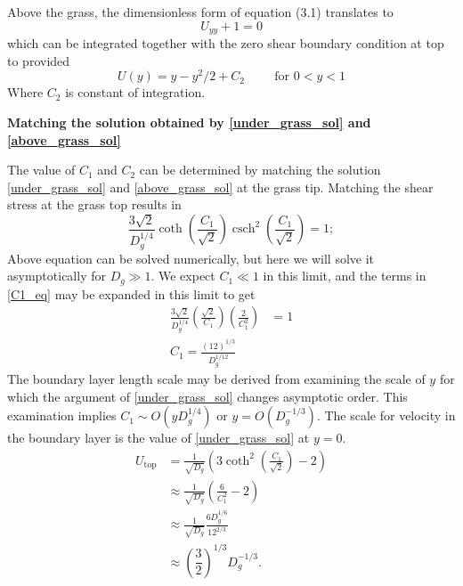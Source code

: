\documentclass[letterpaper,10pt]{article}
\DeclareMathOperator{\csch}{csch}
\begin{document}
\noindent
Above the grass, the dimensionless form of equation (3.1) translates to
\begin{equation}
 U_{yy}+1=0
\end{equation}
which can be integrated together with the zero shear boundary condition at top to provided
\begin{equation}
 U(y) = y-y^2/2+C_2 \hspace{1cm} \text{for $0<y<1$}
 \label{above_grass_sol}
\end{equation}
Where $C_2$ is constant of integration.

\vspace{2mm}
\noindent
\textbf{Matching the solution obtained by \eqref{under_grass_sol} and \eqref{above_grass_sol} }

\noindent
The value of $C_1$ and $C_2$ can be determined by matching the solution \eqref{under_grass_sol} and \eqref{above_grass_sol} at the grass tip.
Matching the shear stress at the grass top results in
\begin{equation}
\frac{3\sqrt{2}}{D_g^{1/4}} \coth\left(\dfrac{C_1}{\sqrt{2}}\right) \csch^2\left(\dfrac{C_1}{\sqrt{2}}\right) = 1;
\label{C1_eq}
\end{equation}
Above equation can be solved numerically, but here we will solve it asymptotically for $D_g \gg 1$. We expect $C_1 \ll 1$ in this limit, and the terms in \eqref{C1_eq} may be expanded in this limit to get
\begin{equation}
\begin{split}
\frac{3\sqrt{2}}{D_g^{1/4}} \left( \frac{\sqrt{2}}{C_1} \right) \left( \frac{2}{C_1^2} \right) &= 1 \\
C_1 = \frac{(12)^{1/3}}{D_g^{1/12}}
\end{split}
\end{equation}
The boundary layer length scale may be derived from examining the scale of $y$ for which the argument of \eqref{under_grass_sol} changes asymptotic order. This examination implies $C_1 \sim O(y D_g^{1/4})$ or $y = O(D_g^{-1/3})$. The scale for velocity in the boundary layer is the value of \eqref{under_grass_sol} at $y=0$.
\begin{align}
 U_\text{top} &=  \frac{1}{\sqrt{D_g}} \left( 3 \coth^2 \left(\frac{C_1}{\sqrt{2}}  \right)-2    \right) \\
              &\approx  \frac{1}{\sqrt{D_g}} \left( \frac{6}{C_1^2} -2    \right) \\
              &\approx \frac{1}{\sqrt{D_g}} \frac{6D_g^{1/6}}{12^{2/3}} \\
              &\approx \left( \dfrac{3}{2} \right)^{1/3} D_g^{-1/3}.
\end{align}
\end{document}

